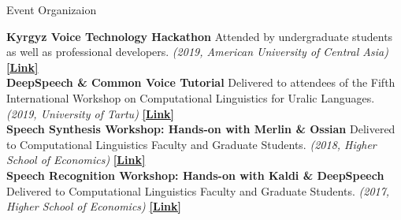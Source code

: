 \documentclass{resume} %
\begin{document}
\begin{minipage}{\textwidth}
\begin{rSection}{Event Organizaion}
\vspace{.25cm}

  {\bf Kyrgyz Voice Technology Hackathon} {Attended by undergraduate students as well as professional developers.} {\em (2019, American University of Central Asia)} \hfill {\href{https://jrmeyer.github.io/kyrgyz-voice-hackathon/}{\textbf{[Link]}}} \\
  
  {\bf DeepSpeech \& Common Voice Tutorial}   {Delivered to attendees of the Fifth International Workshop on Computational Linguistics for Uralic Languages.}  {\em (2019, University of Tartu)} \hfill { \href{https://sisu.ut.ee/iwclul2019/avaleht}{\textbf{[Link]}}}  \\

  {\bf Speech Synthesis Workshop: Hands-on with Merlin \& Ossian}   {Delivered to Computational Linguistics Faculty and Graduate Students.} {\em (2018, Higher School of Economics)} \hfill  {\href{http://jrmeyer.github.io/tts/2016/12/09/tts-workshop.html}{\textbf{[Link]}}} \\

  {\bf Speech Recognition Workshop: Hands-on with Kaldi \& DeepSpeech} {Delivered to Computational Linguistics Faculty and Graduate Students.} {\em (2017, Higher School of Economics)} \hfill  {\href{http://jrmeyer.github.io/misc/stt-vishka.pdf}{\textbf{[Link]}}}\\

\end{rSection}
\end{minipage}





\end{document}

